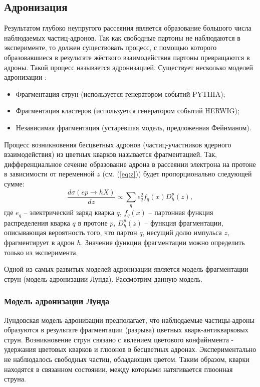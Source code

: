 \documentclass{extarticle}
\begin{document}
\subsection{Адронизация}
Результатом глубоко неупругого рассеяния является образование большого числа наблюдаемых частиц-адронов. Так как свободные партоны не наблюдаются в эксперименте, то должен существовать процесс, с помощью которого образовавшиеся в результате жёсткого взаимодействия партоны превращаются в адроны. Такой процесс называется адронизацией. Существует несколько моделей адронизации  \cite{Hadronization}:
\begin{itemize}
\item Фрагментация струн (используется генератором событий PYTHIA);
\item Фрагментация кластеров (используется генератором событий HERWIG);
\item Независимая фрагментация (устаревшая модель, предложенная Фейнманом).
\end{itemize}
 
Процесс возникновения бесцветных адронов (частиц-участников ядерного взаимодействия) из цветных кварков называется фрагментацией. Так, дифференциальное сечение образование адрона в рассеянии электрона на протоне в зависимости от переменной $z$ (см. (\ref{eq:z})) будет пропорционально следующей сумме:
\begin{equation}
	\frac{d\sigma(ep \rightarrow hX)}{dz} \propto \sum_q e_q^2 f_q (x) D_h^p(z),
\end{equation}
где $e_q$ -- электрический заряд кварка $q$, $f_q (x)$ -- партонная функция распределения кварка $q$ в протоне $p$, $D_h^p(z)$ -- функция фрагментации, описывающая вероятность того, что партон $q$, несущий долю импульса $z$, фрагментирует в адрон $h$. Значение функции фрагментации можно определить только из эксперимента.

Одной из самых развитых моделей адронизации является модель фрагментации струн (модель адронизации Лунда). Рассмотрим данную модель.
\subsubsection{Модель адронизации Лунда}
Лундовская модель адронизации предполагает, что наблюдаемые частицы-адроны образуются в результате фрагментации (разрыва) цветных кварк-антикварковых струн. Возникновение струн связано с явлением цветового конфайнмента - удержания цветовых кварков и глюонов в бесцветных адронах. Экспериментально не наблюдалось свободных частиц, обладающих цветом. Таким образом, кварки находятся в связанном состоянии, между которыми натягивается глюонная струна. 
\end{document}
